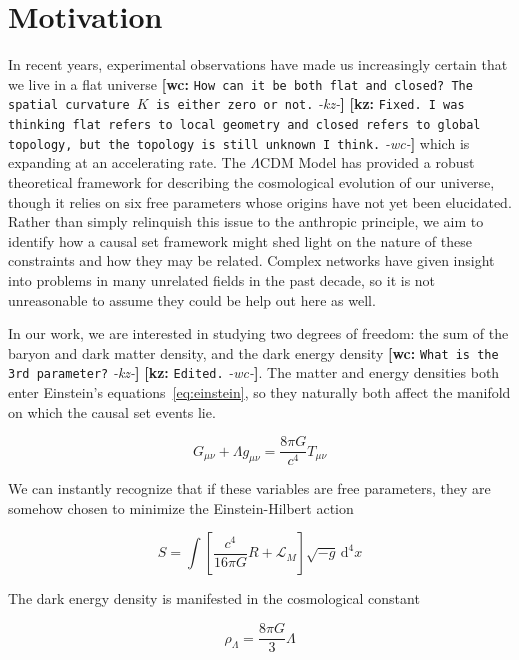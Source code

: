 \documentclass[preprint,notitlepage,amsmath,amssymb,floatfix]{revtex4-1}
\newcommand{\XXX}[3]{{\bf [#1: } {\tt #3} {\it -#2-}{\bf ]}}
\begin{document}
\section{Motivation}
In recent years, experimental observations have made us increasingly certain that we live in a flat universe \XXX{wc}{kz}{How can it be both flat and closed? The spatial curvature $K$ is either zero or not.} \XXX{kz}{wc}{Fixed.  I was thinking flat refers to local geometry and closed refers to global topology, but the topology is still unknown I think.} which is expanding at an accelerating rate.  
The $\Lambda$CDM Model has provided a robust theoretical framework for describing the cosmological evolution of our universe, though it relies on six free parameters whose origins have not yet been elucidated.
Rather than simply relinquish this issue to the anthropic principle, we aim to identify how a causal set framework might shed light on the nature of these constraints and how they may be related.
Complex networks have given insight into problems in many unrelated fields in the past decade, so it is not unreasonable to assume they could be help out here as well. \par
In our work, we are interested in studying two degrees of freedom:  the sum of the baryon and dark matter density, and the dark energy density \XXX{wc}{kz}{What is the 3rd parameter?} \XXX{kz}{wc}{Edited.}.  
The matter and energy densities both enter Einstein's equations~\eqref{eq:einstein}, so they naturally both affect the manifold on which the causal set events lie.

\begin{equation}
\label{eq:einstein}
G_{\mu\nu} + \Lambda g_{\mu\nu} = \frac{8\pi G}{c^4}T_{\mu\nu}
\end{equation}

\noindent We can instantly recognize that if these variables are free parameters, they are somehow chosen to minimize the Einstein-Hilbert action

\begin{equation}
\label{eq:EH_Action}
S = \int\!\left[\frac{c^4}{16\pi G}R+\mathcal{L}_M\right]\sqrt{-g}\, \mathrm d^4x
\end{equation}

\noindent The dark energy density is manifested in the cosmological constant

\begin{equation}
\label{eq:dark_energy_density}
\rho_\Lambda = \frac{8\pi G}{3}\Lambda
\end{equation}
\end{document}
